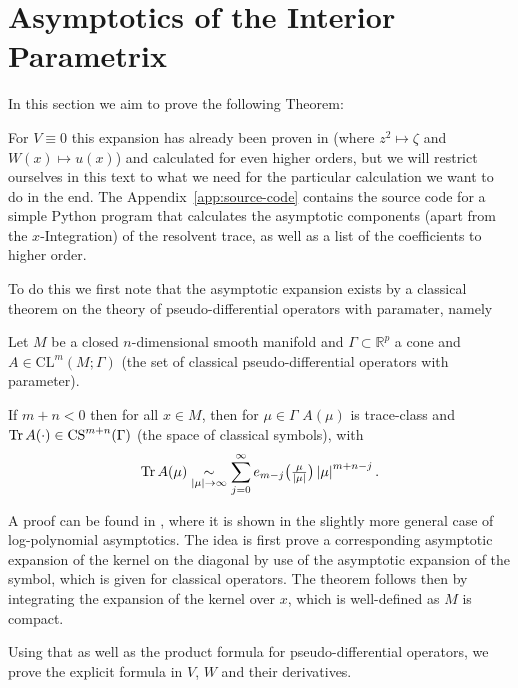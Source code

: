 \section{Asymptotics of the Interior Parametrix}
In this section we aim to prove the following Theorem:
\begin{MainTheorem}
  \label{main:interior}
  
  \begin{Remark}
    For $V\equiv 0$ this expansion has already been proven in
    \cite[Ch 2.1]{Gel'fand1975} (where $z^2 \mapsto \zeta$ and $W(x) \mapsto
    u(x)$) and calculated for even higher orders, but we will restrict ourselves
    in this text to what we need for the particular calculation we want to do in
    the end.  The Appendix~\ref{app:source-code} contains the source code for a
    simple Python program that calculates the asymptotic components (apart from
    the $x$-Integration) of the resolvent trace, as well as a list of the
    coefficients to higher order.
  \end{Remark}
\end{MainTheorem}
To do this we first note that the asymptotic expansion exists by a classical
theorem on the theory of pseudo-differential operators with paramater, namely
\begin{Theorem}
  Let $M$ be a closed $n$-dimensional smooth manifold and
  $\Gamma\subset\mathbb{R}^p$ a cone and $A\in\mathrm{CL}^m(M;\Gamma)$ (the set
  of classical pseudo-differential operators with parameter).

  If $m+n<0$ then for all $x\in M$, then for $\mu\in\Gamma$ $A(\mu)$ is
  trace-class and $\operatorname{Tr} A(\cdot)\in \mathrm{CS}^{m+n}(\Gamma)$ (the space of
  classical symbols), with
  \begin{align*}
    \operatorname{Tr} A(\mu)\mathrel{\underset{\left|\mu\right|\to\infty}{\sim}}
    \sum_{j=0}^{\infty} e_{m-j}\bigl(\tfrac{\mu}{\left|\mu\right|}\bigr)
    \left|\mu\right|^{m+n-j}.
  \end{align*}
  \begin{Proof}
    A proof can be found in \cite[Thm 5.1]{Les:PDO}, where it is shown in the
    slightly more general case of log-polynomial asymptotics. The idea is first
    prove a corresponding asymptotic expansion of the kernel on the diagonal by
    use of the asymptotic expansion of the symbol, which is given for classical
    operators. The theorem follows then by integrating the expansion of the
    kernel over $x$, which is well-defined as $M$ is compact.
  \end{Proof}
\end{Theorem}
Using that as well as the product formula for pseudo-differential operators, we
prove the explicit formula in $V$, $W$ and their derivatives.

